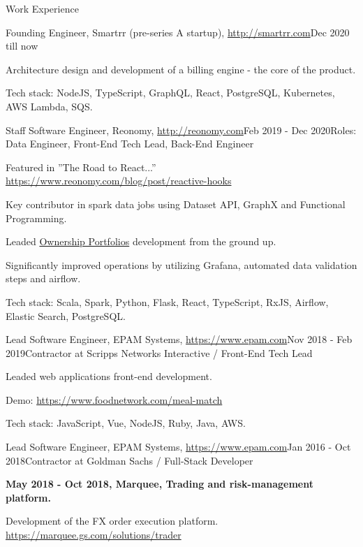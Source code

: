 \documentclass{resume}
\begin{document}
\begin{rSection}{Work Experience}

\begin{rSubsection}{Founding Engineer, Smartrr (pre-series A startup), \url{http://smartrr.com}}{Dec 2020 till now}{}{}
\item Architecture design and development of a billing engine - the core of the product.

Tech stack: NodeJS, TypeScript, GraphQL, React, PostgreSQL, Kubernetes, AWS Lambda, SQS.
\end{rSubsection}

\begin{rSubsection}{Staff Software Engineer, Reonomy, \url{http://reonomy.com}}{Feb 2019 - Dec 2020}{Roles: Data Engineer, Front-End Tech Lead, Back-End Engineer}{}
\item Featured in ”The Road to React...” \url{https://www.reonomy.com/blog/post/reactive-hooks}
\item Key contributor in spark data jobs using Dataset API, GraphX and Functional Programming.
\item Leaded \href{https://www.reonomy.com/blog/post/reonomy-launches-ownership-portfolio-beta}{Ownership Portfolios} development from the ground up.
\item Significantly improved operations by utilizing Grafana, automated data validation steps and airflow.

Tech stack: Scala, Spark, Python, Flask, React, TypeScript, RxJS, Airflow, Elastic Search, PostgreSQL.
\end{rSubsection}

\begin{rSubsection}{Lead Software Engineer, EPAM Systems, \url{https://www.epam.com}}{Nov 2018 - Feb 2019}{Contractor at Scripps Networks Interactive / Front-End Tech Lead}{}
\item Leaded web applications front-end development.

Demo: \url{https://www.foodnetwork.com/meal-match}

Tech stack: JavaScript, Vue, NodeJS, Ruby, Java, AWS.
\end{rSubsection}

\begin{rSubsection}{Lead Software Engineer, EPAM Systems, \url{https://www.epam.com}}{Jan 2016 - Oct 2018}{Contractor at Goldman Sachs / Full-Stack Developer}{}
\item[] \textbf{May 2018 - Oct 2018, Marquee, Trading and risk-management platform.}
\item Development of the FX order execution platform. \url{https://marquee.gs.com/solutions/trader}


\end{rSubsection}
\end{rSection}
\end{document}
